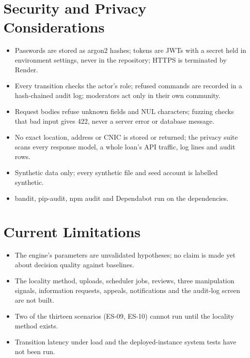 \section{Security and Privacy Considerations}\label{sec:security-privacy-considerations}
\begin{itemize}
\item Passwords are stored as argon2 hashes; tokens are JWTs with a secret held in environment settings, never in the repository; HTTPS is terminated by Render.
\item Every transition checks the actor's role; refused commands are recorded in a hash-chained audit log; moderators act only in their own community.
\item Request bodies refuse unknown fields and NUL characters; fuzzing checks that bad input gives 422, never a server error or database message.
\item No exact location, address or CNIC is stored or returned; the privacy suite scans every response model, a whole loan's API traffic, log lines and audit rows.
\item Synthetic data only; every synthetic file and seed account is labelled synthetic.
\item bandit, pip-audit, npm audit and Dependabot run on the dependencies.
\end{itemize}

\section{Current Limitations}\label{sec:current-limitations}
\begin{itemize}
\item The engine's parameters are unvalidated hypotheses; no claim is made yet about decision quality against baselines.
\item The locality method, uploads, scheduler jobs, reviews, three manipulation signals, information requests, appeals, notifications and the audit-log screen are not built.
\item Two of the thirteen scenarios (ES-09, ES-10) cannot run until the locality method exists.
\item Transition latency under load and the deployed-instance system tests have not been run.
\end{itemize}
